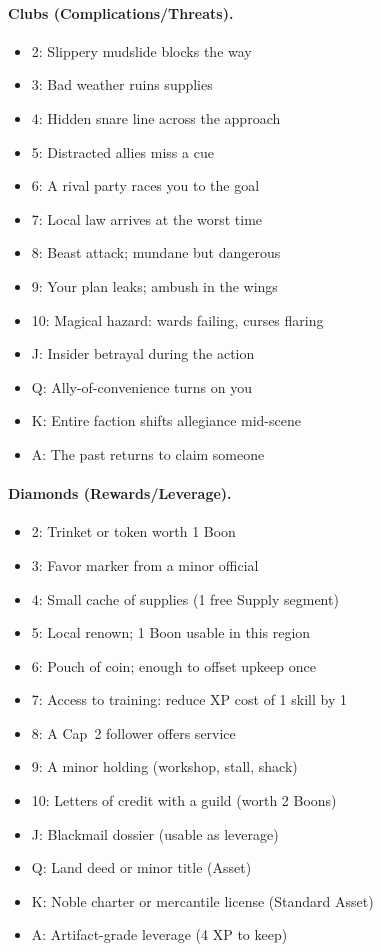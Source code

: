 \documentclass[12pt]{book}
\begin{document}
\paragraph{Clubs (Complications/Threats).}
\begin{itemize}
  \item 2: Slippery mudslide blocks the way
  \item 3: Bad weather ruins supplies
  \item 4: Hidden snare line across the approach
  \item 5: Distracted allies miss a cue
  \item 6: A rival party races you to the goal
  \item 7: Local law arrives at the worst time
  \item 8: Beast attack; mundane but dangerous
  \item 9: Your plan leaks; ambush in the wings
  \item 10: Magical hazard: wards failing, curses flaring
  \item J: Insider betrayal during the action
  \item Q: Ally-of-convenience turns on you
  \item K: Entire faction shifts allegiance mid-scene
  \item A: The past returns to claim someone
\end{itemize}

\paragraph{Diamonds (Rewards/Leverage).}
\begin{itemize}
  \item 2: Trinket or token worth 1 Boon
  \item 3: Favor marker from a minor official
  \item 4: Small cache of supplies (1 free Supply segment)
  \item 5: Local renown; 1 Boon usable in this region
  \item 6: Pouch of coin; enough to offset upkeep once
  \item 7: Access to training: reduce XP cost of 1 skill by 1
  \item 8: A Cap~2 follower offers service
  \item 9: A minor holding (workshop, stall, shack)
  \item 10: Letters of credit with a guild (worth 2 Boons)
  \item J: Blackmail dossier (usable as leverage)
  \item Q: Land deed or minor title (Asset)
  \item K: Noble charter or mercantile license (Standard Asset)
  \item A: Artifact-grade leverage (4 XP to keep)
\end{itemize}
\end{document}
